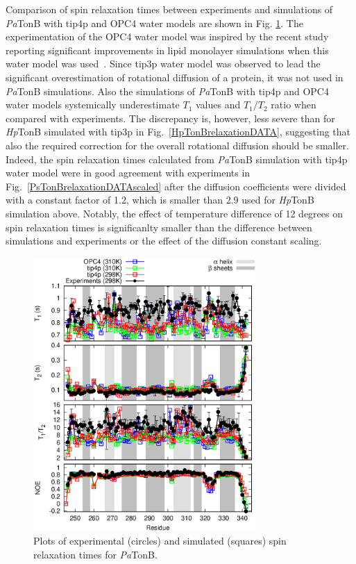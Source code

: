 \documentclass[pre,aps,floatfix,authordate1-4,twocolumn]{revtex4-1}
\begin{document}
Comparison of spin relaxation times between experiments and simulations
of {\it Pa}TonB with tip4p and OPC4 water models
are shown in Fig. \ref{PsTonBrelaxationDATA}.
The experimentation of the OPC4 water model was inspired by the
recent study reporting significant improvements in lipid monolayer
simulations when this water model was used~\cite{javanainen17}. 
Since tip3p water model was observed to lead the significant overestimation of
rotational diffusion of a protein, it was not used in {\it Pa}TonB
simulations.
Also the simulations of {\it Pa}TonB with
tip4p and OPC4 water models systemically underestimate $T_1$ values
and $T_1/T_2$ ratio when compared with experiments.
The discrepancy is, however, less severe than for {\it Hp}TonB simulated
with tip3p in Fig.~\ref{HpTonBrelaxationDATA}, suggesting that also
the required correction for the overall rotational diffusion should
be smaller. Indeed,
the spin relaxation times calculated
from {\it Pa}TonB simulation with tip4p water model
were in good agreement with experiments in Fig.~\ref{PsTonBrelaxationDATAscaled}
after the diffusion coefficients were divided with a constant factor of 1.2,
which is smaller than 2.9 used for {\it Hp}TonB simulation above.
Notably, the effect of temperature difference of 12 degrees
on spin relaxation times is significanlty smaller than the difference
between simulations and experiments or the effect of the diffusion constant scaling.
\begin{figure}[!h]
  \includegraphics[width=8.5cm]{../Figs/PsTonBrelaxationDATA.eps}%
  \caption{Plots of experimental (circles) and simulated (squares) spin relaxation times
    for {\it Pa}TonB. \label{PsTonBrelaxationDATA}}%
\end{figure}
\end{document}
